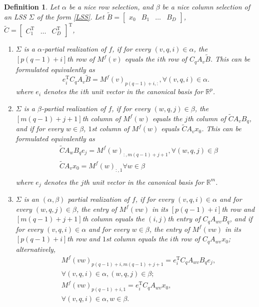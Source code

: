 \documentclass[journal]{IEEEtran}
\newtheorem{Definition}{Definition}
\begin{document}
\begin{Definition} \label{def:alphabeta_partreal}
	Let $\alpha$ be a nice row selection, and $\beta$ be a nice column selection of an LSS $\Sigma$ of the form \eqref{LSS}. Let
	$\widetilde{B}=\begin{bmatrix} x_0 & B_1 & \ldots & B_{D} \end{bmatrix}$,
	$\widetilde{C}=\begin{bmatrix} C^{\mathrm{T}}_1 & \ldots & C^{\mathrm{T}}_{D} \end{bmatrix}^{\mathrm{T}}$,
	
	\begin{enumerate}
		\item $\Sigma$ is a $\alpha$-partial realization of $f$, if for every $(v,q,i) \in \alpha$, the $\left[ p(q-1)+i \right]$th row of $M^f(v)$ equals the $i$th row of $C_qA_v\widetilde{B}$. This can be formulated equivalently as
		\[
		e_i^{\mathrm{T}}C_qA_v\widetilde{B}=M^f(v)_{p(q-1)+i,:}, \forall (v,q,i) \in \alpha.
		\]
		where $e_i$ denotes the $i$th unit vector in the canonical basis for $\mathbb{R}^p$.
		\item $\Sigma$ is a $\beta$-partial realization of $f$, if for every $(w,q,j) \in \beta$, the $\left[ m(q-1)+j+1 \right]$th column of $M^f(w)$ equals the $j$th column of $\widetilde{C}A_vB_q$, and if for every $w \in \beta$, $1$st column of $M^f(w)$ equals $\widetilde{C}A_vx_0$. This can be formulated equivalently as
		\begin{equation*}
		\begin{aligned}
		& \widetilde{C}A_wB_qe_{j}=M^f(w)_{:,m(q-1)+j+1}, \forall (w,q,j) \in \beta \\
		& \widetilde{C}A_vx_0 = M^f(w)_{:,1} \forall w \in \beta \\
		\end{aligned}
		\end{equation*}
		where $e_{j}$ denotes the $j$th unit vector in the canonical basis for $\mathbb{R}^{m}$.
		\item $\Sigma$ is an $(\alpha,\beta)$ partial realization of $f$, if for every $(v,q,i) \in \alpha$ and for every $(w,q,j) \in \beta$, the entry of $M^f(vw)$ in its $\left[ p(q-1)+i \right]$th row and $\left[ m(q-1)+j+1 \right]$th column equals the $(i,j)$th entry of $C_qA_{wv}B_q$, and if for every $(v,q,i) \in \alpha$ and for every $w \in \beta$, the entry of $M^f(vw)$ in its $\left[ p(q-1)+i \right]$th row and $1$st column equals the $i$th row of $C_qA_{wv}x_0$; alternatively,
		\begin{align*}
			& M^f(vw)_{p(q-1)+i , m(q-1)+j+1} = e_i^{\mathrm{T}}C_qA_{wv}B_qe_j, \\
			& \forall (v,q,i) \in \alpha, (w,q,j) \in \beta; \\
			& M^f(vw)_{p(q-1)+i , 1} = e_i^{\mathrm{T}}C_qA_{wv}x_0,  \\
			& \forall (v,q,i) \in \alpha, w \in \beta.
		\end{align*}
	\end{enumerate}
	
\end{Definition}
\end{document}
